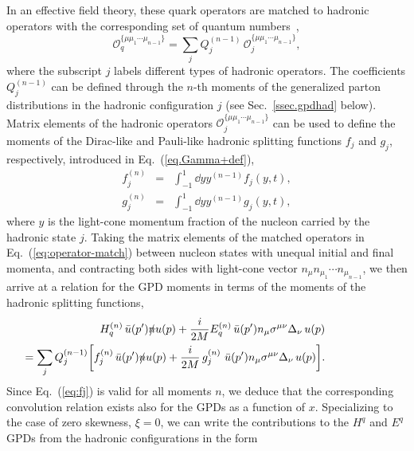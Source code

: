 \documentclass[preprintnumbers,prd,superscriptaddress,preprint]{revtex4-1}
\begin{document}
In an effective field theory, these quark operators are matched to hadronic operators with the corresponding set of quantum numbers~\cite{Chen:2001eg},
%
\begin{equation}\label{eq:operator-match}
\mathcal{O}^{\{\mu\mu_1\cdots \mu_{n-1} \}}_q
= \sum_j Q^{(n-1)}_j\,
        \mathcal{O}^{\{\mu\mu_1 \cdots \mu_{n-1}\}}_j,
\end{equation}
%
where the subscript $j$ labels different types of hadronic operators.
%
The coefficients $Q^{(n-1)}_j$ can be defined through the $n$-th moments of the generalized parton distributions in the hadronic configuration $j$ (see Sec.~\ref{ssec.gpdhad} below).
Matrix elements of the hadronic operators $\mathcal{O}^{\{\mu\mu_1 \cdots \mu_{n-1}\}}_j$ can be used to define the moments of the Dirac-like and Pauli-like hadronic splitting functions $f_j$ and $g_j$, respectively, introduced in Eq.~(\ref{eq.Gamma+def}),
%
\begin{subequations}
\begin{eqnarray}
f^{(n)}_j &=& \int^{1}_{-1} \dd{y} y^{(n-1)} f_j(y,t), \\
g^{(n)}_j &=& \int^{1}_{-1} \dd{y} y^{(n-1)} g_j(y,t),
\end{eqnarray}
\end{subequations}
%
where $y$ is the light-cone momentum fraction of the nucleon carried by the hadronic state $j$.
Taking the matrix elements of the matched operators in Eq.~(\ref{eq:operator-match}) between nucleon states with unequal initial and final momenta, and contracting both sides with light-cone vector $n_\mu n_{\mu_1}\cdots n_{\mu_{n-1}}$, we then arrive at a relation for the GPD moments in terms of the moments of the hadronic splitting functions,
%
\begin{eqnarray}
\label{eq:fj}
& & H_q^{(n)}\, 
  \bar{u}(p') \slashed {n} u(p) 
+ \frac{i}{2M} 
  E_q^{(n)}\, 
  \bar{u}(p') n_{\mu}\sigma^{\mu\nu}\Delta_\nu\, u(p) \notag\\
& & \hspace*{-2.35cm}
= \sum_j Q^{(n-1)}_j
\bigg[ 
   f^{(n)}_j\, 
   \bar{u}(p') \slashed {n} u(p) 
 + \frac{i}{2M}\, 
   g^{(n)}_j\ 
   \bar{u}(p') n_{\mu}\sigma^{\mu\nu}\Delta_\nu\, u(p) 
\bigg].
\end{eqnarray}
%
Since Eq.~(\ref{eq:fj}) is valid for all moments $n$, we deduce that the corresponding convolution relation exists also for the GPDs as a function of $x$.
Specializing to the case of zero skewness, $\xi=0$, we can write the contributions to the $H^q$ and $E^q$ GPDs from the hadronic configurations in the form
\end{document}
